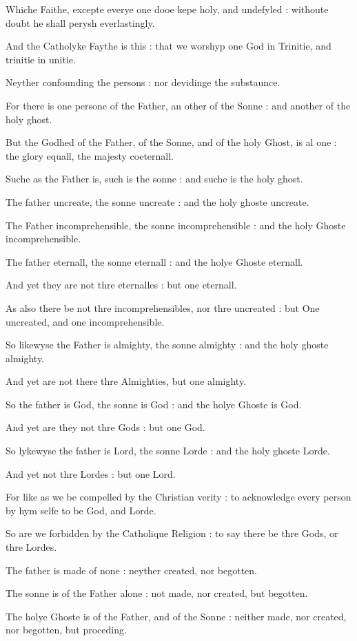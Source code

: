 Whiche Faithe, excepte everye one dooe kepe holy, and
undefyled : withoute doubt he shall perysh everlastingly.

And the Catholyke Faythe is this : that we worshyp
one God in Trinitie, and trinitie in unitie.

Neyther confounding the persons : nor devidinge the
substaunce. 

For there is one persone of the Father, an other of
the Sonne : and another of the holy ghost.

But the Godhed of the Father, of the Sonne, and of
the holy Ghost, is al one : the glory equall, the majesty coeternall.

Suche as the Father is, such is the sonne : and suche
is the holy ghost.

The father uncreate, the sonne uncreate : and the holy
ghoste uncreate.

The Father incomprehensible, the sonne incomprehensible
: and the holy Ghoste incomprehensible.

The father eternall, the sonne eternall : and the holye
Ghoste eternall. 

And yet they are not thre eternalles : but one eternall.

As also there be not thre incomprehensibles, nor thre
uncreated : but One uncreated, and one incomprehensible.

So likewyse the Father is almighty, the sonne almighty
: and the holy ghoste almighty.

And yet are not there thre Almighties, but one almighty.

So the father is God, the sonne is God : and the holye
Ghoste is God.

And yet are they not thre Gods : but one God.

So lykewyse the father is Lord, the sonne Lorde : and
the holy ghoste Lorde.

And yet not thre Lordes : but one Lord.

For like as we be compelled by the Christian verity
: to acknowledge every person by hym selfe to be God, and Lorde.

So are we forbidden by the Catholique Religion : to
say there be thre Gods, or thre Lordes.

The father is made of none : neyther created, nor begotten.

The sonne is of the Father alone : not made, nor created,
but begotten.

The holye Ghoste is of the Father, and of the Sonne
: neither made, nor created, nor begotten, but proceding.

